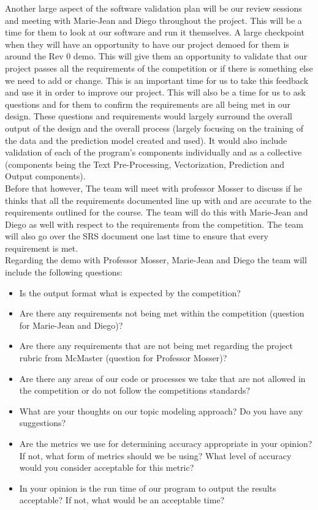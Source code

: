 \documentclass[12pt, titlepage]{article}
\begin{document}
  Another large aspect of the software validation plan will be our review sessions and meeting with Marie-Jean and Diego throughout the project. This will be a time for them to look at our software and run it themselves. A large checkpoint when they will have an opportunity to have our project demoed for them is around the Rev 0 demo. This will give them an opportunity to validate that our project passes all the requirements of the competition or if there is something else we need to add or change. This is an important time for us to take this feedback and use it in order to improve our project. This will also be a time for us to ask questions and for them to confirm the requirements are all being met in our design. These questions and requirements would largely surround the overall output of the design and the overall process (largely focusing on the training of the data and the prediction model created and used). It would also include validation of each of the program's components individually and as a collective (components being the Text Pre-Processing, Vectorization, Prediction and Output components). \\

  Before that however, The team will meet with professor Mosser to discuss if he thinks that all the requirements documented line up with and are accurate to the requirements outlined for the course. The team will do this with Marie-Jean and Diego as well with respect to the requirements from the competition. The team will also go over the SRS document one last time to ensure that every requirement is met. \\  
  
  Regarding the demo with Professor Mosser, Marie-Jean and Diego the team will include the following questions:
  
  \begin{itemize}
  \item Is the output format what is expected by the competition?
  \item Are there any requirements not being met within the competition (question for Marie-Jean and Diego)?
  \item Are there any requirements that are not being met regarding the project rubric from McMaster (question for Professor Mosser)?
  \item Are there any areas of our code or processes we take that are not allowed in the competition or do not follow the competitions standards?
  \item What are your thoughts on our topic modeling approach? Do you have any suggestions?
  \item Are the metrics we use for determining accuracy appropriate in your opinion? If not, what form of metrics should we be using? What level of accuracy would you consider acceptable for this metric?
  \item In your opinion is the run time of our program to output the results acceptable? If not, what would be an acceptable time?\end{itemize}
  
\end{document}

